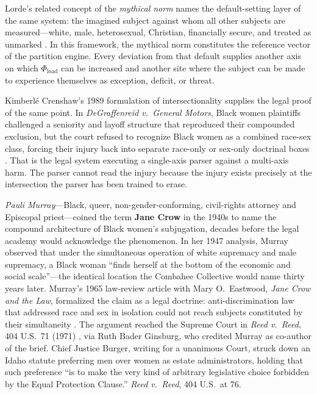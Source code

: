 Lorde's related concept of the \textit{mythical norm} names the default-setting layer of the same system: the imagined subject against whom all other subjects are measured---white, male, heterosexual, Christian, financially secure, and treated as unmarked \cite{lorde_sister_outsider}. In this framework, the mythical norm constitutes the reference vector of the partition engine. Every deviation from that default supplies another axis on which $\Phi_{\text{load}}$ can be increased and another site where the subject can be made to experience themselves as exception, deficit, or threat.

Kimberl{\'e} Crenshaw's 1989 formulation of intersectionality supplies the legal proof of the same point. In \textit{DeGraffenreid v.\ General Motors}, Black women plaintiffs challenged a seniority and layoff structure that reproduced their compounded exclusion, but the court refused to recognize Black women as a combined race-sex class, forcing their injury back into separate race-only or sex-only doctrinal boxes \cite{degraffenreid_gm_1976, crenshaw_demarginalizing_1989}. That is the legal system executing a single-axis parser against a multi-axis harm. The parser cannot read the injury because the injury exists precisely at the intersection the parser has been trained to erase.

\textit{Pauli Murray}---Black, queer, non-gender-conforming, civil-rights attorney and Episcopal priest---coined the term \textbf{Jane Crow} in the 1940s to name the compound architecture of Black women's subjugation, decades before the legal academy would acknowledge the phenomenon. In her 1947 analysis, Murray observed that under the simultaneous operation of white supremacy and male supremacy, a Black woman ``finds herself at the bottom of the economic and social scale''---the identical location the Combahee Collective would name thirty years later. Murray's 1965 law-review article with Mary O.\ Eastwood, \textit{Jane Crow and the Law}, formalized the claim as a legal doctrine: anti-discrimination law that addressed race and sex in isolation could not reach subjects constituted by their simultaneity \cite{murray_janecrow}. The argument reached the Supreme Court in \textit{Reed v.\ Reed}, 404 U.S.\ 71 (1971) \cite{reed_v_reed}, via Ruth Bader Ginsburg, who credited Murray as co-author of the brief. Chief Justice Burger, writing for a unanimous Court, struck down an Idaho statute preferring men over women as estate administrators, holding that such preference ``is to make the very kind of arbitrary legislative choice forbidden by the Equal Protection Clause.'' \textit{Reed v.\ Reed}, 404 U.S.\ at 76.

